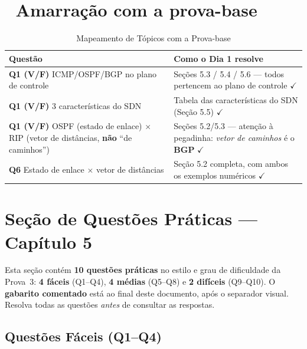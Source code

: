 \documentclass[11pt,a4paper]{article}
\begin{document}
\hrulefill

\section*{🎯 Amarração com a prova-base}

\begin{table}[h!]
\centering
\caption{Mapeamento de Tópicos com a Prova-base}
\label{tab:relacao_prova}
\begin{tabularx}{\textwidth}{XX}
\toprule
\textbf{Questão} & \textbf{Como o Dia 1 resolve} \\
\midrule
\textbf{Q1 (V/F)} ICMP/OSPF/BGP no plano de controle & Seções 5.3 / 5.4 / 5.6 --- todos pertencem ao plano de controle $\checkmark$ \\
\textbf{Q1 (V/F)} 3 características do SDN & Tabela das características do SDN (Seção 5.5) $\checkmark$ \\
\textbf{Q1 (V/F)} OSPF (estado de enlace) $\times$ RIP (vetor de distâncias, \textbf{não} ``de caminhos'') & Seções 5.2/5.3 --- atenção à pegadinha: \emph{vetor de caminhos} é o \textbf{BGP} $\checkmark$ \\
\textbf{Q6} Estado de enlace $\times$ vetor de distâncias & Seção 5.2 completa, com ambos os exemplos numéricos $\checkmark$ \\
\bottomrule
\end{tabularx}
\end{table}


\clearpage
\hrulefill

\section*{Seção de Questões Práticas --- Capítulo 5}

\begin{nota}
Esta seção contém \textbf{10 questões práticas} no estilo e grau de dificuldade da Prova~3: \textbf{4 fáceis} (Q1--Q4), \textbf{4 médias} (Q5--Q8) e \textbf{2 difíceis} (Q9--Q10). O \textbf{gabarito comentado} está ao final deste documento, após o separador visual. Resolva todas as questões \emph{antes} de consultar as respostas.
\end{nota}

\subsection*{Questões Fáceis (Q1--Q4)}
\end{document}
